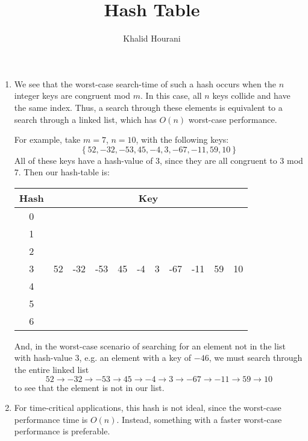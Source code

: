 \documentclass[a4paper]{article}
\title{Hash Table}
\author{Khalid Hourani}
\begin{document}
\maketitle

\begin{enumerate}
\item We see that the worst-case search-time of such a hash occurs when the $n$ integer keys are congruent mod $m$. In this case, all $n$ keys collide and have the same index. Thus, a search through these elements is equivalent to a search through a linked list, which has $O(n)$ worst-case performance. 

For example, take $m=7$, $n=10$, with the following keys: \[\left\{52,-32,-53,45,-4,3,-67,-11,59,10\right\}\] All of these keys have a hash-value of 3, since they are all congruent to 3 mod 7. Then our hash-table is: \begin{center}\begin{tabular}{|c|c c c c c c c c c c|}\hline Hash&\multicolumn{10}{c|}{Key}\\\hline0&&&&&&&&&&\\\hline1&&&&&&&&&&\\\hline2&&&&&&&&&&\\\hline3&52&-32&-53&45&-4&3&-67&-11&59&10\\\hline4&&&&&&&&&&\\\hline5&&&&&&&&&&\\\hline6&&&&&&&&&&\\\hline\end{tabular}\end{center} And, in the worst-case scenario of searching for an element not in the list with hash-value 3, e.g. an element with a key of $-46$, we must search through the entire linked list \[52\to-32\to-53\to45\to-4\to3\to-67\to-11\to59\to10\] to see that the element is not in our list.

\item For time-critical applications, this hash is not ideal, since the worst-case performance time is $O(n)$. Instead, something with a faster worst-case performance is preferable. 
\end{enumerate}
\end{document}
